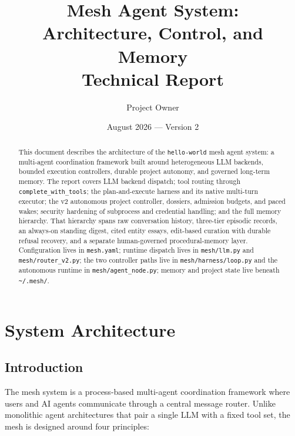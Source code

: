 \documentclass[11pt,letterpaper]{report}
\title{Mesh Agent System:\\Architecture, Control, and Memory\\[0.5em]
\large Technical Report}
\author{Project Owner}
\date{August 2026 --- Version 2}
\newcommand{\code}[1]{\texttt{#1}}
\begin{document}
\maketitle

\begin{abstract}
This document describes the architecture of the \code{hello-world} mesh
agent system: a multi-agent coordination framework built around
heterogeneous LLM backends, bounded execution controllers, durable
project autonomy, and governed long-term memory. The report covers LLM
backend dispatch; tool routing through \code{complete\_with\_tools}; the
plan-and-execute harness and its native multi-turn executor; the v2
autonomous project controller, dossiers, admission budgets, and paced
wakes; security hardening of subprocess and credential handling; and the
full memory hierarchy. That hierarchy spans raw conversation history,
three-tier episodic records, an always-on standing digest, cited entity
essays, edit-based curation with durable refusal recovery, and a separate
human-governed procedural-memory layer.
Configuration lives in \code{mesh.yaml}; runtime dispatch lives in
\code{mesh/llm.py} and \code{mesh/router\_v2.py}; the two controller
paths live in \code{mesh/harness/loop.py} and the autonomous runtime in
\code{mesh/agent\_node.py}; memory and project state live beneath
\code{\textasciitilde/.mesh/}.
\end{abstract}

\tableofcontents

\part{System Architecture}
\label{part:architecture}

\chapter{Introduction}
\label{ch:intro}

The mesh system is a process-based multi-agent coordination framework
where users and AI agents communicate through a central message router.
Unlike monolithic agent architectures that pair a single LLM with a
fixed tool set, the mesh is designed around four principles:
\end{document}
